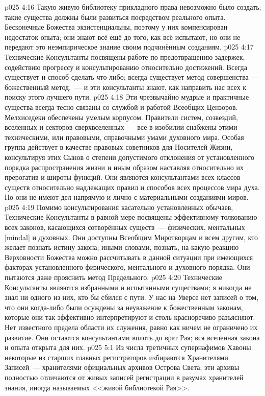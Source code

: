 \vs p025 4:16 Такую живую библиотеку прикладного права невозможно было создать; такие существа должны были развиться посредством реального опыта. Бесконечные Божества экзистенциальны, поэтому у них компенсирован недостаток опыта; они знают всё ещё до того, как всё испытают, но они не передают это неэмпирическое знание своим подчинённым созданиям.
\vs p025 4:17 \pc Технические Консультанты посвящены работе по предотвращению задержек, содействию прогрессу и консультированию относительно достижений. Всегда существует  и  способ сделать что\hyp{}либо; всегда существует метод совершенства~--- божественный метод,~--- и эти консультанты знают, как направить нас всех к поиску этого лучшего пути.
\vs p025 4:18 Эти чрезвычайно мудрые и практичные существа всегда тесно связаны со службой и работой Всеобщих Цензоров. Мелхиседеки обеспечены умелым корпусом. Правители систем, созвездий, вселенных и секторов сверхвселенных~--- все в изобилии снабжены этими техническими, или правовыми, справочными умами духовного мира. Особая группа действует в качестве правовых советников для Носителей Жизни, консультируя этих Сынов о степени допустимого отклонения от установленного порядка распространения жизни и иным образом наставляя относительно их прерогатив и широты функций. Они являются консультантами всех классов существ относительно надлежащих правил и способов всех процессов мира духа. Но они не имеют дел напрямую и лично с материальными созданиями миров.
\vs p025 4:19 Помимо консультирования касательно установленных обычаев, Технические Консультанты в равной мере посвящены эффективному толкованию всех законов, касающихся сотворённых существ~--- физических, ментальных [mindal] и духовных. Они доступны Всеобщим Миротворцам и всем другим, кто желает познать истину закона; иными словами, познать, на какую реакцию Верховности Божества можно рассчитывать в данной ситуации при имеющихся факторах установленного физического, ментального и духовного порядка. Они пытаются даже прояснить метод Предельного.
\vs p025 4:20 Технические Консультанты являются избранными и испытанными существами; я никогда не знал ни одного из них, кто бы сбился с пути. У нас на Уверсе нет записей о том, что они когда\hyp{}либо были осуждены за неуважение к божественным законам, которые они так эффективно интерпретируют и столь красноречиво разъясняют. Нет известного предела области их служения, равно как ничем не ограничено их развитие. Они остаются консультантами вплоть до врат Рая; вся вселенная закона и опыта открыта для них.
\vs p025 5:1 Из числа третичных супернафимов Хавоны некоторые из старших главных регистраторов избираются Хранителями Записей~--- хранителями официальных архивов Острова Света; эти архивы полностью отличаются от живых записей регистрации в разумах хранителей знания, иногда называемых <<живой библиотекой Рая>>.
